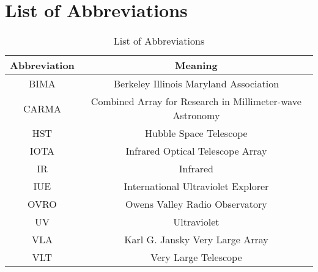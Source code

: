 
\chapter{List of Abbreviations}
\label{app:1}

\begin{table}[!hbt]
\begin{center}
\caption[List of Abbreviations]
{List of Abbreviations}
\begin{tabular}{cc}
\hline
\hline
\rule{0pt}{2.5ex}Abbreviation & Meaning\\
\hline
BIMA & Berkeley Illinois Maryland Association \\
CARMA & Combined Array for Research in Millimeter-wave Astronomy \\
HST & Hubble Space Telescope \\
IOTA & Infrared Optical Telescope Array\\
IR & Infrared \\
IUE & International Ultraviolet Explorer \\
OVRO & Owens Valley Radio Observatory \\
UV & Ultraviolet \\
VLA & Karl G. Jansky Very Large Array \\
VLT & Very Large Telescope \\

\hline
\end{tabular}
\label{tab:6.4.1}
\end{center}
\end{table}


